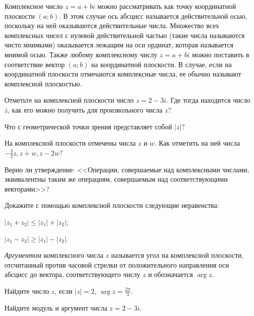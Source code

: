 \documentclass[a4paper, 12pt, num=21, date=02.09.2019]{listok}
\begin{document}
\begin{definition}
	Комплексное число $z = a + bi$ можно рассматривать как точку координатной плоскости $(a; b)$.
	В этом случае ось абсцисс называется действительной осью, поскольку на ней оказываются действительные числа.
	Множество всех комплексных чисел с нулевой действительной частью (такие числа называются чисто мнимыми) оказывается лежащим на оси ординат,
	которая называется мнимой осью.
	Также любому комплексному числу $z = a + bi$ можно поставить в соответствие вектор $(a; b)$ на координатной плоскости.
	В случае, если на координатной плоскости отмечаются комплексные числа, ее обычно называют комплексной плоскостью.
\end{definition}
\begin{problem}
\begin{probparts}
	\item Отметьте на комплексной плоскости число $z = 2 - 3i$. Где тогда находится число $\bar z$,
	как его можно получить для произвольного числа $z$?
	\item Что с геометрической точки зрения представляет собой $|z|$?
	\item На комплексной плоскости отмечены числа $z$ и $w$.
	Как отметить на ней числа $-\frac 32 z, z + w, z - 2w$?
\end{probparts}
\end{problem}
\begin{problem}
	Верно ли утверждение: <<Операции, совершаемые над комплексными числами, эквивалентны таким же операциям, совершаемым над соответствующими векторами>>?
\end{problem}
\begin{problem}
	Докажите с помощью комплексной плоскости следующие неравенства:
	\begin{multienum}{2}
		\item  $|z_1 + z_2| \le |z_1| + |z_2|$;
		\item  $|z_1 - z_2| \ge |z_1| - |z_2|$.
	\end{multienum}
\end{problem}
\begin{definition}
	\textit{Аргументом} комплексного числа $z$ называется угол на комплексной плоскости,
	отсчитанный против часовой стрелки от положительного направления оси абсцисс до вектора,
	соответствующего числу $z$ и обозначается $\arg z$.
\end{definition}
\begin{problem}
\begin{probparts}
	\item Найдите число $z$, если $|z| = 2$, $\arg z = \frac{2\pi}3$.
	\item Найдите модуль и аргумент числа $z = 2 - 3i$.
\end{probparts}
\end{problem}
\end{document}
